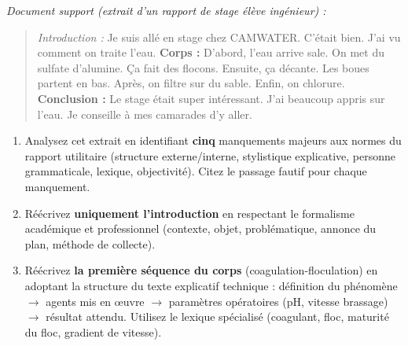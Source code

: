 \documentclass[11pt]{article}
\begin{document}
\begin{exercice}
    \textit{Document support (extrait d'un rapport de stage élève ingénieur) :}
    \begin{quote}
    \og \textit{Introduction :} Je suis allé en stage chez CAMWATER. C'était bien. J'ai vu comment on traite l'eau. \textbf{Corps :} D'abord, l'eau arrive sale. On met du sulfate d'alumine. Ça fait des flocons. Ensuite, ça décante. Les boues partent en bas. Après, on filtre sur du sable. Enfin, on chlorure. \textbf{Conclusion :} Le stage était super intéressant. J'ai beaucoup appris sur l'eau. Je conseille à mes camarades d'y aller.\fg
    \end{quote}
    \begin{enumerate}
        \item Analysez cet extrait en identifiant \textbf{cinq} manquements majeurs aux normes du rapport utilitaire (structure externe/interne, stylistique explicative, personne grammaticale, lexique, objectivité). Citez le passage fautif pour chaque manquement.
        \item Réécrivez \textbf{uniquement l'introduction} en respectant le formalisme académique et professionnel (contexte, objet, problématique, annonce du plan, méthode de collecte).
        \item Réécrivez \textbf{la première séquence du corps} (coagulation-floculation) en adoptant la structure du texte explicatif technique : définition du phénomène $\rightarrow$ agents mis en œuvre $\rightarrow$ paramètres opératoires (pH, vitesse brassage) $\rightarrow$ résultat attendu. Utilisez le lexique spécialisé (coagulant, floc, maturité du floc, gradient de vitesse).
    \end{enumerate}
\end{exercice}
\end{document}

